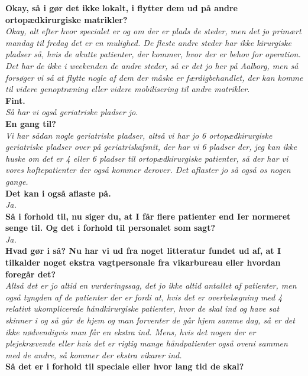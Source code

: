 \noindent
\textbf{Okay, så i gør det ikke lokalt, i flytter dem ud på andre ortopædkirurgiske matrikler?} \\
\noindent
\textit{Okay, alt efter hvor specialet er og om der er plads de steder, men det jo primært mandag til fredag det er en mulighed. De fleste andre steder har ikke kirurgiske pladser så, hvis de akutte patienter, der kommer, hvor der er behov for operation. Det har de ikke i weekenden de andre steder, så er det jo her på Aalborg, men så forsøger vi så at flytte nogle af dem der måske er færdigbehandlet, der kan komme til videre genoptræning eller videre mobilisering til andre matrikler. } \\
\noindent
\textbf{Fint.} \\
\noindent
\textit{Så har vi også geriatriske pladser jo.} \\
\noindent
\textbf{En gang til?} \\
\noindent
\textit{Vi har sådan nogle geriatriske pladser, altså vi har jo 6 ortopædkirurgiske geriatriske pladser over på geriatriskafsnit, der har vi 6 pladser der, jeg kan ikke huske om det er 4 eller 6 pladser til ortopædkirurgiske patienter, så der har vi vores hoftepatienter der også kommer derover. Det aflaster jo så også os nogen gange.} \\
\noindent
\textbf{Det kan i også aflaste på.} \\
\noindent
\textit{Ja.} \\
\noindent
\textbf{Så i forhold til, nu siger du, at I får flere patienter end Ier normeret senge til. Og det i forhold til personalet som sagt?} \\
\noindent
\textit{Ja.} \\
\noindent
\textbf{Hvad gør i så? Nu har vi ud fra noget litteratur fundet ud af, at I tilkalder noget ekstra vagtpersonale fra vikarbureau eller hvordan foregår det? } \\
\noindent
\textit{Altså det er jo altid en vurderingssag, det jo ikke altid antallet af patienter, men også tyngden af de patienter der er fordi at, hvis det er overbelægning med 4 relativt ukomplicerede håndkirurgiske patienter, hvor de skal ind og have sat skinner i og så går de hjem og man forventer de går hjem samme dag, så er det ikke nødvendigvis man får en ekstra ind. Mens, hvis det nogen der er plejekrævende eller hvis det er rigtig mange håndpatienter også oveni sammen med de andre, så kommer der ekstra vikarer ind. }\\
\noindent
\textbf{Så det er i forhold til speciale eller hvor lang tid de skal?} \\
